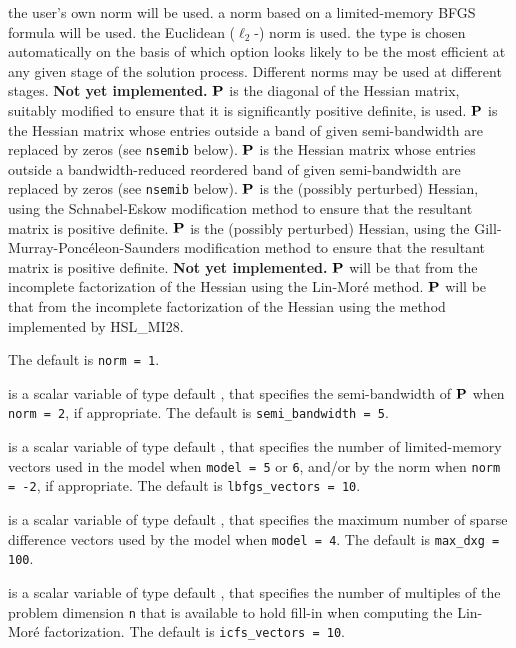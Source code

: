 \documentclass{galahad}
\begin{document}
\begin{description}
\begin{description}
 the user's own norm will be used.
 a norm based on a limited-memory BFGS formula will be used.
 the Euclidean ($\ell_2$-) norm is used.
 the type is chosen automatically on the basis of which option looks
        likely to be the most efficient at any given stage of the solution
        process. Different norms may be used at different stages.
        {\bf Not yet implemented.}
 ${\mathbf{P}}$ is the diagonal of the Hessian matrix, suitably modified to
        ensure that it is significantly positive definite, is used.
 ${\mathbf{P}}$ is the Hessian matrix whose entries outside a band of
         given semi-bandwidth are replaced by zeros
        (see {\tt nsemib} below).
 ${\mathbf{P}}$ is the Hessian matrix whose entries outside a
        bandwidth-reduced reordered band of given semi-bandwidth are
        replaced by zeros (see {\tt nsemib} below).
 ${\mathbf{P}}$ is the (possibly perturbed) Hessian,
         using the Schnabel-Eskow modification
        method to ensure that the resultant matrix is positive definite.
 ${\mathbf{P}}$ is the (possibly perturbed) Hessian,
        using the Gill-Murray-Ponc\'{e}leon-Saunders
        modification method to ensure that the resultant matrix is
        positive definite.
        {\bf Not yet implemented.}
 ${\mathbf{P}}$ will be that from the incomplete factorization of the Hessian
        using the Lin-Mor\'{e} method.
 ${\mathbf{P}}$ will be that from the incomplete factorization of the Hessian
        using the method implemented by HSL\_MI28.
\end{description}
The default is {\tt norm = 1}.

 is a scalar variable of type default \integer,
that specifies
the semi-bandwidth of ${\mathbf{P}}$ when {\tt norm = 2},
if appropriate.
The default is {\tt semi\_bandwidth = 5}.

 is a scalar variable of type default \integer,
that specifies the number of limited-memory vectors used in the model
when {\tt model = 5} or {\tt 6},
and/or by the norm when {\tt norm = -2},
if appropriate.
The default is {\tt lbfgs\_vectors = 10}.

 is a scalar variable of type default \integer,
that specifies the maximum number of sparse difference
vectors used by the model when {\tt model = 4}.
The default is {\tt max\_dxg = 100}.

 is a scalar variable of type default \integer,
that specifies the number of multiples of the problem dimension {\tt n}
that is available to hold fill-in when computing the Lin-Mor\'{e}
factorization.
The default is {\tt icfs\_vectors = 10}.


\end{description}
\end{document}
